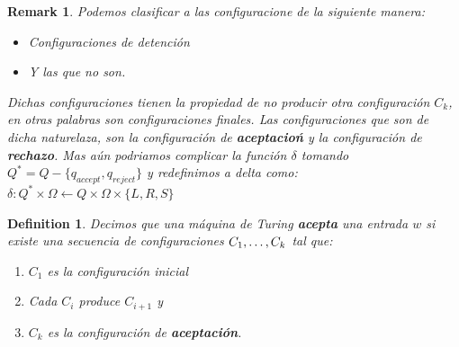 \documentclass[10pt]{report}
\newtheorem*{remark}{Remark}
\newtheorem{definition}{Definition}
\begin{document}
    \begin{remark}
        Podemos clasificar a las configuracione de la siguiente manera:
        \begin{itemize}
            \item  Configuraciones de detención
            \item Y las que no son.
        \end{itemize}
        Dichas configuraciones tienen la propiedad de no producir otra configuración $C_{k}$,
        en otras palabras son configuraciones finales.
        Las configuraciones que son de dicha naturelaza, son la configuración de \textbf{aceptacioń}
        y la configuración de \textbf{rechazo}.\newline
        Mas aún podriamos complicar la función $\delta$
        tomando $Q^* = Q-\{q_{accept}, q_{reject} \}$\newline
        y redefinimos a delta como:\newline
        $\delta:Q^*\times\Omega\leftarrow Q\times\Omega\times\{L,R,S \}$
    \end{remark}

    \theoremstyle{definition}
    \begin{definition}
        Decimos que una máquina de Turing \textbf{acepta} una entrada $w$ si existe una secuencia de configuraciones
        $C_{1},\mathellipsis,C_{k}$ tal que:
        \begin{enumerate}
            \item $C_{1}$ es la configuración inicial
            \item Cada $C_{i}$  produce $C_{i+1}$ y
            \item $C_{k}$ es la configuración de \textbf{aceptación}.
        \end{enumerate}
    \end{definition}
\end{document}
